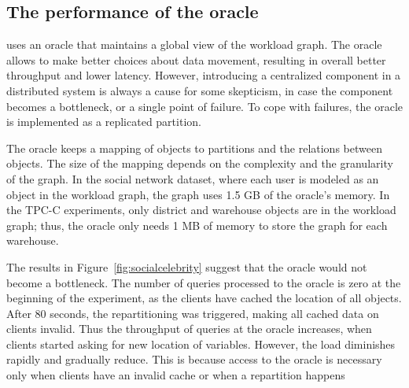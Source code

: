 
\subsection{The performance of the oracle}

\dynastar  uses an oracle that maintains a global view of the workload graph. The oracle allows
\dynastar to make better choices about data movement, resulting in overall
better throughput and lower latency. However, introducing a centralized
component in a distributed system is always a cause for some skepticism,
in case the component becomes a bottleneck, or a single point of failure. 
To cope with failures, the oracle is implemented as a replicated partition. 

The oracle keeps a mapping of objects to partitions and the relations between objects. 
The size of the mapping depends on the complexity and the granularity of the graph. 
In the social network dataset, where each user is modeled as an object in the workload graph, 
the graph uses 1.5 GB of the oracle's memory.
In the TPC-C experiments, only district and warehouse objects are in the workload graph;
thus, the oracle only needs 1 MB of memory to store the graph for each warehouse.

The results in Figure~\ref{fig:socialcelebrity} suggest that the oracle would not become a bottleneck.
The number of queries processed to the oracle is zero at the 
beginning of the experiment, as the clients have cached the location of all objects.
After 80 seconds, the repartitioning was triggered, making all cached data on clients invalid.
Thus the throughput of queries at the oracle increases, when clients started asking for new location of variables.
However, the load diminishes rapidly and gradually reduce. This is because access to the oracle is necessary only
when clients have an invalid cache or when a repartition happens


